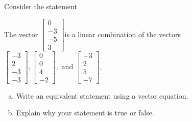 
\begin{exerciseStatement}


Consider the statement 
\begin{center}\begin{minipage}{0.8\textwidth}
 The vector \( \left[\begin{array}{c}
0 \\
-3 \\
-5 \\
3
\end{array}\right] \)is a linear combination of the vectors \( \left[\begin{array}{c}
-3 \\
2 \\
-3 \\
-3
\end{array}\right] , \left[\begin{array}{c}
0 \\
0 \\
4 \\
-2
\end{array}\right] , \text{ and } \left[\begin{array}{c}
-3 \\
2 \\
5 \\
-7
\end{array}\right] \). 
\end{minipage}\end{center}
    


\begin{enumerate}[(a)]
\item  Write an equivalent statement using a vector equation.
\item  Explain why your statement is true or false.
\end{enumerate}
    
\end{exerciseStatement}
    
